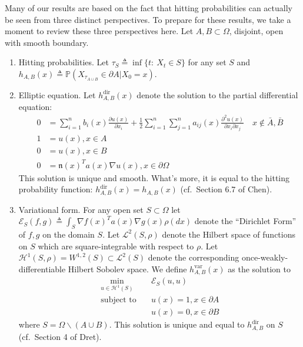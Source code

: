 \documentclass[12pt, nofootinbib,english, amsmath, amssymb, aps, priprint, graphicx,floatfix]{revtex4-1}
\theoremstyle{plain}
\theoremstyle{definition}
\theoremstyle{plain}
\newcommand{\normal}{{\mathfrak{n}}}
\begin{document}
{Many of our results are based on the fact that hitting probabilities can actually be seen from three distinct perspectives.  To prepare for these results, we take a moment to review these three perspectives here.  Let $A,B\subset \Omega$, disjoint, open with smooth boundary.

\begin{enumerate}
\item Hitting probabilities.  Let $\tau_S \triangleq \inf\{t:\ X_t \in S\}$ for any set $S$ and $h_{A,B}(x) \triangleq \mathbb{P}(X_{\tau_{A\cup B}}\in \partial A|X_0=x)$.

\item Elliptic equation.  Let $h^\mathrm{dir}_{A,B}(x)$ denote the solution to the partial differential equation:
	    \begin{align}\label{eq:pde}
    0 &= \sum_{i = 1}^n b_i (x) \frac{\partial u
        (x)}{\partial x_i} + \frac{1}{2} \sum_{i = 1}^n \sum_{j = 1}^n a_{ij} (x)
        \frac{\partial^2 u (x)}{\partial x_i \partial x_j}\quad x\notin \bar A,\bar B\\
    1 &= u(x),x\in  A \nonumber \\
    0 &= u(x),x\in  B \nonumber \\
    0 &= \normal(x)^Ta(x)\nabla u(x), x \in \partial{\Omega}
    \nonumber
    \end{align}
This solution is unique and smooth.\cite{lieberman1986mixed}  What's more, it is equal to the hitting probability function: $h^\mathrm{dir}_{A,B}(x)=h_{A,B}(x)$ (cf.\ Section 6.7 of Chen\cite{chen2012symmetric}).
\item Variational form.  For any open set $S\subset \Omega$ let $\mathscr{E}_{S}(f,g)\triangleq \int_S \nabla f(x)^T a(x) \nabla g(x) \rho(dx)$ denote the ``Dirichlet Form'' of $f,g$ on the domain $S$.  Let $\mathscr L^2(S,\rho)$ denote the Hilbert space of functions on $S$ which are square-integrable with respect to $\rho$.  Let $\mathcal{H}^1(S,\rho)=W^{1,2}(S) \subset \mathscr{L}^2(S)$ denote the corresponding once-weakly-differentiable Hilbert Sobolev space.  We define $h^\mathrm{var}_{A,B}(x)$ as the solution to
    \begin{align*}
    \min_{u \in \mathcal H^1(S)} \quad & \mathscr{E}_S(u,u) \\
    \mbox{subject to} \quad & u(x)=1,x\in \partial A \\
     & u(x)=0,x\in \partial B
    \end{align*}
    where $S=\Omega \backslash (A\cup B)$.  This solution is unique and equal to $h^\mathrm{dir}_{A,B}$ on $S$ (cf.\ Section 4 of Dret\cite{dret2016partial}).

\end{enumerate}}
\end{document}
